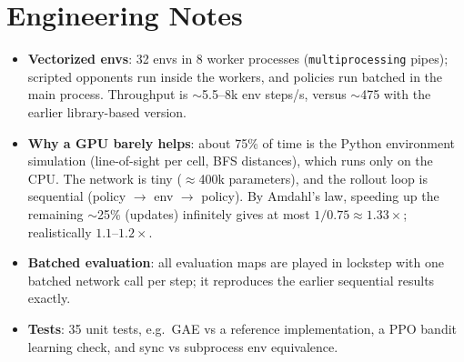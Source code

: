 \documentclass[11pt,a4paper]{article}
\newcommand{\code}[1]{\texttt{#1}}
\begin{document}
\section{Engineering Notes}
\begin{itemize}
  \item \textbf{Vectorized envs}: 32 envs in 8 worker processes (\code{multiprocessing} pipes);
        scripted opponents run inside the workers, and policies run batched in the main process.
        Throughput is $\sim$5.5--8k env steps/s, versus $\sim$475 with the earlier library-based version.
  \item \textbf{Why a GPU barely helps}: about 75\% of time is the Python environment simulation
        (line-of-sight per cell, BFS distances), which runs only on the CPU. The network is tiny
        ($\approx$400k parameters), and the rollout loop is sequential (policy $\to$ env $\to$ policy).
        By Amdahl's law, speeding up the remaining $\sim$25\% (updates) infinitely gives at most
        $1/0.75\approx1.33\times$; realistically $1.1$--$1.2\times$.
  \item \textbf{Batched evaluation}: all evaluation maps are played in lockstep with one batched
        network call per step; it reproduces the earlier sequential results exactly.
  \item \textbf{Tests}: 35 unit tests, e.g.\ GAE vs a reference implementation, a PPO bandit learning
        check, and sync vs subprocess env equivalence.
\end{itemize}

\end{document}
